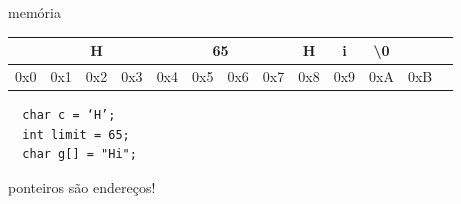 \documentclass{beamer}
\begin{document}
\begin{frame}{memória}
  \begin{center}\small
    \begin{tabular}{|c|c|c|c|c|c|c|c|c|c|c|c|c|}
      \hline
      & & \cellcolor{orange!20} H   &  & \multicolumn{4}{c|}{\cellcolor{green!20} 65} & \cellcolor{blue!20} H &
       \cellcolor{blue!20} i & \cellcolor{blue!20} \textbackslash 0 & \\
      \hline
      0x0 & 0x1 & 0x2 & 0x3 & 0x4 & 0x5 & 0x6 & 0x7 & 0x8 & 0x9 & 0xA & 0xB \\
      \hline
    \end{tabular}
  \end{center}

  \begin{verbatim}
  char c = ‘H’;
  int limit = 65;
  char g[] = "Hi";
  \end{verbatim}

  ponteiros são endereços!

\end{frame}
\end{document}
